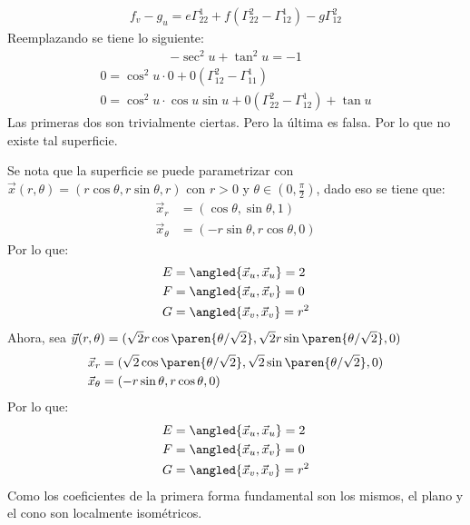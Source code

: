 \documentclass{homework}
\begin{document}
\begin{sol}
\begin{enumerate}
\begin{align*}
                  f_v-g_u=e\Gamma^1_{2 2}+f(\Gamma^2_{2 2}-\Gamma^1_{1 2})-g\Gamma^2_{1 2}
              \end{align*}
              Reemplazando se tiene lo siguiente:
              \begin{align*}
                  -\sec^2 u+\tan^2u=-1
              \end{align*}
              \begin{align*}
                  0=\cos^2 u\cdot 0+0(\Gamma^2_{1 2}-\Gamma^1_{1 1}) \\
                  0=\cos^2 u\cdot \cos u\sin u+0(\Gamma^2_{2 2}-\Gamma^1_{1 2})+\tan u
              \end{align*}
              Las primeras dos son trivialmente ciertas. Pero la última es falsa. Por lo que no existe tal superficie.
    \end{enumerate}
\end{sol}

\begin{sol}
    Se nota que la superficie se puede parametrizar con \(\vec{x}(r,\theta)=(r\cos\theta,r\sin\theta,r)\) con \(r>0\) y \(\theta\in(0,\frac\pi2)\), dado eso se tiene que:
    \begin{align*}
        \vec{x}_r      & =(\cos\theta,\sin\theta,1)    \\
        \vec{x}_\theta & =(-r\sin\theta,r\cos\theta,0)
    \end{align*}
    Por lo que:
    \begin{align*}
        E & =\angled{\vec{x}_u,\vec{x}_u}=2   \\
        F & =\angled{\vec{x}_u,\vec{x}_v}=0   \\
        G & =\angled{\vec{x}_v,\vec{x}_v}=r^2
    \end{align*}
    Ahora, sea \(\vec{y}(r,\theta)=(\sqrt{2}r\cos\paren{\theta/\sqrt{2}},\sqrt{2}r\sin\paren{\theta/\sqrt{2}},0)\)
    \begin{align*}
        \vec{x}_r      & =(\sqrt{2}\cos\paren{\theta/\sqrt{2}},\sqrt{2}\sin\paren{\theta/\sqrt{2}},0) \\
        \vec{x}_\theta & =(-r\sin\theta,r\cos\theta,0)
    \end{align*}
    Por lo que:
    \begin{align*}
        E & =\angled{\vec{x}_u,\vec{x}_u}=2   \\
        F & =\angled{\vec{x}_u,\vec{x}_v}=0   \\
        G & =\angled{\vec{x}_v,\vec{x}_v}=r^2
    \end{align*}
    Como los coeficientes de la primera forma fundamental son los mismos, el plano y el cono son localmente isométricos.
\end{sol}
\end{document}
